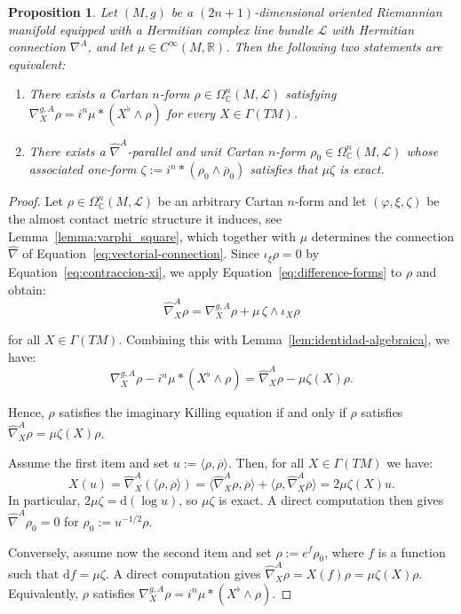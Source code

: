 \documentclass[10pt,a4paper,twoside,reqno]{amsart}
\theoremstyle{plain}
\newtheorem{prop}[thm]{Proposition}
\theoremstyle{definition}
\theoremstyle{remark}
\def\C{\mathbb{C}}
\def\R{\mathbb{R}}
\def\dd{\mathrm{d}}
\def\R{\mathbb{R}}
\def\dd{\mathrm{d}}
\newcommand{\escal}[1]{\langle#1\rangle}
\begin{document}
\begin{prop}
\label{prop:killing-vs-parallel}
Let $(M,g)$ be a $(2n+1)$-dimensional oriented Riemannian manifold equipped with a Hermitian complex line bundle $\mathcal{L}$ with Hermitian connection $\nabla^A$, and let $\mu\in C^\infty(M,\R)$. Then the following two statements are equivalent:
\begin{enumerate}
    \item[\normalfont(1)] There exists a Cartan $n$-form $\rho\in\Omega^n_\C(M,\mathcal{L})$ satisfying $\nabla^{g,A}_X\rho=i^n\mu*(X^\flat\wedge\rho)$ for every $X\in\Gamma(TM)$.
    \item[\normalfont(2)] There exists a $\hat\nabla^A$-parallel and unit Cartan $n$-form $\rho_0\in\Omega^n_\C(M,\mathcal{L})$ whose associated one-form $\zeta:=i^n*(\rho_0\wedge\overline{\rho}_0)$ satisfies that $\mu\zeta$ is exact.
\end{enumerate}
\end{prop}

\begin{proof}
Let $\rho\in\Omega^n_\C(M,\mathcal{L})$ be an arbitrary Cartan $n$-form and let $(\varphi,\xi,\zeta)$ be the almost contact metric structure it induces, see Lemma~\ref{lemma:varphi_square}, which together with $\mu$ determines the connection $\hat\nabla$ of Equation~\eqref{eq:vectorial-connection}. Since $\iota_\xi\rho=0$ by Equation~\eqref{eq:contraccion-xi}, we apply Equation~\eqref{eq:difference-forms} to $\rho$ and obtain:
\begin{equation*}
\hat\nabla^A_X\rho=\nabla^{g,A}_X\rho+\mu\,\zeta\wedge\iota_X\rho
\end{equation*}

\noindent
for all $X\in\Gamma(TM)$. Combining this with Lemma~\ref{lem:identidad-algebraica}, we have:
\begin{equation*}
    \nabla^{g,A}_X\rho-i^n\mu*(X^\flat\wedge\rho)=\hat\nabla^A_X\rho-\mu\zeta(X)\rho.
\end{equation*}

\noindent
Hence, $\rho$ satisfies the imaginary Killing equation if and only if $\rho$ satisfies $\hat\nabla^A_X\rho=\mu\zeta(X)\rho$.\medskip

\noindent
Assume the first item and set $u:=\escal{\rho,\overline{\rho}}$. Then, for all $X\in \Gamma(TM)$ we have:
\begin{equation*}
    X(u) = \hat\nabla_X^A (\escal{\rho, \overline{\rho}}) = \escal{\hat\nabla_X^A \rho, \overline{\rho}} + \escal{\rho,\hat\nabla_X^A \overline{\rho}} = 2\mu \zeta(X) u.
\end{equation*}
In particular, $2\mu\zeta = \dd(\log u)$, so $\mu\zeta$ is exact. A direct computation then gives $\hat\nabla^A\rho_0 = 0$ for $\rho_0 := u^{-1/2} \rho$.\medskip

\noindent
Conversely, assume now the second item and set $\rho := e^{f} \rho_0$, where $f$ is a function such that $\dd f = \mu\zeta$. A direct computation gives $\hat\nabla^A_X \rho = X(f) \rho = \mu \zeta(X) \rho$. Equivalently, $\rho$ satisfies $\nabla^{g,A}_X\rho=i^n\mu*(X^\flat\wedge\rho)$.
\end{proof}
\end{document}
